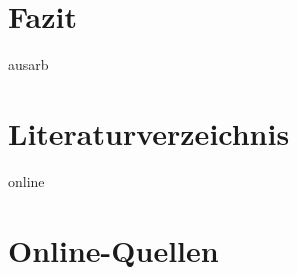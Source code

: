 \documentclass[11pt]{article} %
\begin{document}
\section{Fazit} \label{sec:faz}

\newpage


\newpage

\listoffigures %
\listoftables %
%
\begin{btSect}{ausarb}
\section*{Literaturverzeichnis}
\btPrintCited
\end{btSect}
\begin{btSect}{online}
\section*{Online-Quellen}
\btPrintCited
\end{btSect}
\end{document}
